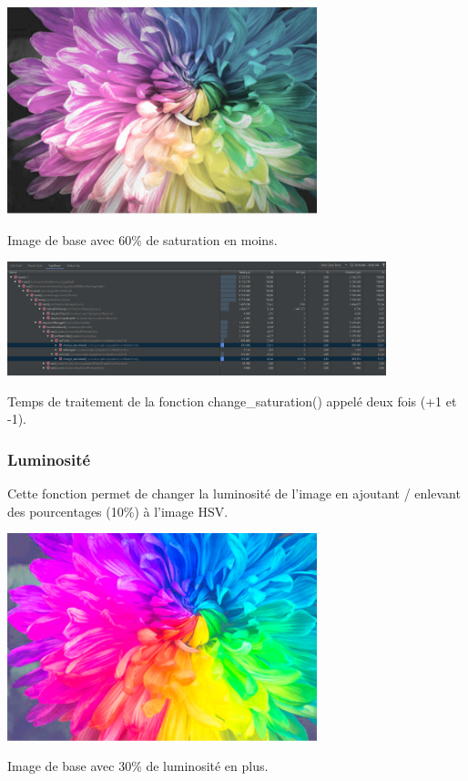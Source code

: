 \documentclass{article}
\begin{document}
\begin{center} 
    \includegraphics[width=9cm]{../Image_fonctions/SaturationMoins6}

    Image de base avec 60\% de saturation en moins.
\end{center}
\bigbreak

\begin{center} 
    \includegraphics[width=11cm]{../Image_temps/TempsChangeSaturation}

    Temps de traitement de la fonction change\_saturation() appelé deux fois (+1 et -1).
\end{center}
\bigbreak

\subsubsection{Luminosité}
Cette fonction permet de changer la luminosité de l'image en ajoutant / enlevant des pourcentages (10\%) à l'image HSV.
\bigbreak

\begin{center} 
    \includegraphics[width=9cm]{../Image_fonctions/LuminositePlus3}

    Image de base avec 30\% de luminosité en plus.
\end{center}
\bigbreak
\end{document}
